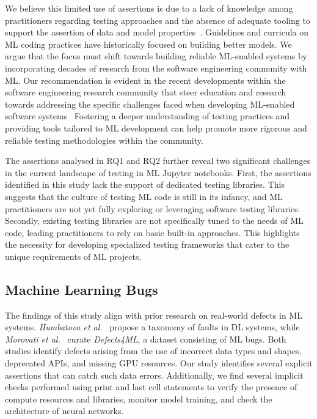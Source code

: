 We believe this limited use of assertions is due to a lack of knowledge among practitioners regarding testing approaches and the absence of adequate tooling to support the assertion of data and model properties~\cite{simmons2020large-scale}. Guidelines and curricula on ML coding practices have historically focused on building better models. We argue that the focus must shift towards building reliable ML-enabled systems by incorporating decades of research from the software engineering community with ML. Our recommendation is evident in the recent developments within the software engineering research community that steer education and research towards addressing the specific challenges faced when developing ML-enabled software systems~\cite{tudremla,mlinprod,kastner2020teaching,cain2024,icse2025} Fostering a deeper understanding of testing practices and providing tools tailored to ML development can help promote more rigorous and reliable testing methodologies within the community.

The assertions analysed in RQ1 and RQ2 further reveal two significant challenges in the current landscape of testing in ML Jupyter notebooks. First, the assertions identified in this study lack the support of dedicated testing libraries. This suggests that the culture of testing ML code is still in its infancy, and ML practitioners are not yet fully exploring or leveraging software testing libraries. Secondly, existing testing libraries are not specifically tuned to the needs of ML code, leading practitioners to rely on basic built-in approaches. This highlights the necessity for developing specialized testing frameworks that cater to the unique requirements of ML projects.


\subsection{Machine Learning Bugs}

The findings of this study align with prior research on real-world defects in ML systems. \emph{Humbatova et al.}~\cite{humbatova2020taxonomy} propose a taxonomy of faults in DL systems, while \emph{Morovati et al.}~\cite{morovati2023bugs} curate \emph{Defects4ML}, a dataset consisting of ML bugs. Both studies identify defects arising from the use of incorrect data types and shapes, deprecated APIs, and missing GPU resources. Our study identifies several explicit assertions that can catch such data errors. Additionally, we find several implicit checks performed using print and last cell statements to verify the presence of compute resources and libraries, monitor model training, and check the architecture of neural networks. 

